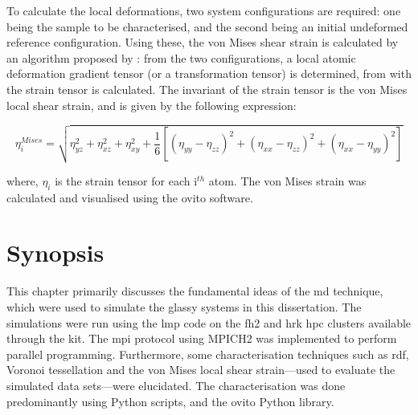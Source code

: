 To calculate the local deformations, two system configurations are required: one being the sample to be characterised, and the second being an initial undeformed reference configuration. Using these, the von Mises shear strain is calculated by an algorithm proposed by \textcite{Shimizu2007}: from the two configurations, a local atomic deformation gradient tensor (or a transformation tensor) is determined, from with the strain tensor is calculated. The invariant of the strain tensor is the von Mises local shear strain, and is given by the following expression:

\begin{equation}
\eta_i ^{Mises} = \sqrt{\eta_{yz}^2 + \eta_{xz}^2 + \eta_{xy}^2 + \frac{1}{6} \left[ \left(\eta_{yy} - \eta_{zz}\right)^2 + \left(\eta_{xx} - \eta_{zz}\right)^2 + \left(\eta_{xx} - \eta_{yy}\right)^2 \right]}
\end{equation}

where, $\eta_i$ is the strain tensor for each i$^{th}$ atom. The von Mises strain was calculated and visualised using the \gls{ovito} software.

%

\clearpage
\section{Synopsis}
This chapter primarily discusses the fundamental ideas of the \gls{md} technique, which were used to simulate the glassy systems in this dissertation. The simulations were run using the \gls{lmp} code on the \gls{fh2} and \gls{hrk} \gls{hpc} clusters available through the \gls{kit}. The \gls{mpi} protocol using MPICH2 was implemented to perform parallel programming. Furthermore, some characterisation techniques such as \gls{rdf}, Voronoi tessellation and the von Mises local shear strain---used to evaluate the simulated data sets---were elucidated. The characterisation was done predominantly using Python scripts, and the \gls{ovito} Python library. \par

